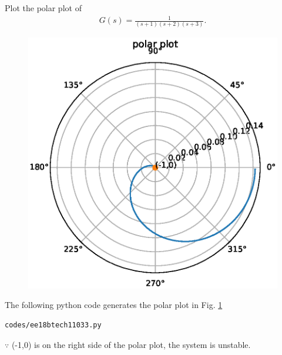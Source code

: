 \item Plot the polar plot of 
\begin{align}
G(s) = \frac{1}{(s+1)(s+2)(s+3)}. 
\end{align}

\solution


\begin{figure}[!ht]
\centering
  \includegraphics[width=\columnwidth]{./figs/ee18btech11033.eps}
\caption{}
  \label{fig:ee18btech11033}
  \label{fig:ee18btech11033}
\end{figure}

The following python code generates the polar plot in Fig.   \ref{fig:ee18btech11033}

\begin{lstlisting}
codes/ee18btech11033.py
\end{lstlisting}
$\because$  (-1,0) is on the right side of the polar plot, the system is unstable.

